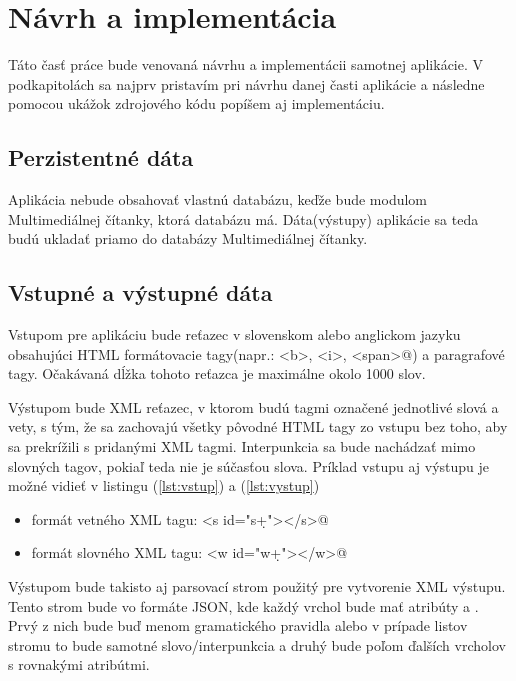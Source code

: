 \documentclass[12pt,a4paper]{report}
\theoremstyle{definition}
\theoremstyle{remark}
\begin{document}

\chapter{Návrh a implementácia}
Táto časť práce bude venovaná návrhu a implementácii samotnej aplikácie. V podkapitolách sa najprv pristavím pri návrhu danej časti aplikácie a následne pomocou ukážok zdrojového kódu popíšem aj implementáciu.

\section{Perzistentné dáta}
Aplikácia nebude obsahovať vlastnú databázu, keďže bude modulom Multimediálnej čítanky, ktorá databázu má. Dáta(výstupy) aplikácie sa teda budú ukladať priamo do databázy Multimediálnej čítanky.

\section{Vstupné a výstupné dáta}
Vstupom pre aplikáciu bude reťazec v slovenskom alebo anglickom jazyku obsahujúci HTML formátovacie tagy(napr.: \verb@<b>, <i>, <span>@) a paragrafové tagy. Očakávaná dĺžka tohoto reťazca je maximálne okolo 1000 slov.

Výstupom bude XML reťazec, v ktorom budú tagmi označené jednotlivé slová a vety, s tým, že sa zachovajú všetky pôvodné HTML tagy zo vstupu bez toho, aby sa prekrížili s pridanými XML tagmi. Interpunkcia sa bude nachádzať mimo slovných tagov, pokiaľ teda nie je súčasťou slova. Príklad vstupu aj výstupu je možné vidieť v listingu (\ref{lst:vstup}) a (\ref{lst:vystup})
\begin{itemize}
\item formát vetného XML tagu: \verb@<s id="s\d+"></s>@
\item formát slovného XML tagu: \verb@<w id="w\d+"></w>@
\end{itemize}

Výstupom bude takisto aj parsovací strom použitý pre vytvorenie XML výstupu. Tento strom bude vo formáte JSON, kde každý vrchol bude mať atribúty \verb@name@ a \verb@children@. Prvý z nich bude buď menom gramatického pravidla alebo v prípade listov stromu to bude samotné slovo/interpunkcia a druhý bude poľom ďalších vrcholov s rovnakými atribútmi.
\end{document}
